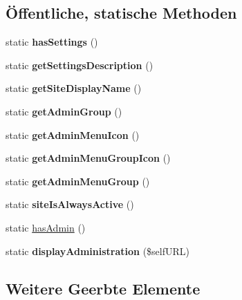 \subsection*{Öffentliche, statische Methoden}
\begin{DoxyCompactItemize}
\item 
\mbox{\label{class_admin_update_a3ccbcd4c40f7ea37d6d5cd3c8854d072}} 
static {\bfseries has\+Settings} ()
\item 
\mbox{\label{class_admin_update_af04ea0771e2fa826fbf9e7fc60eb94e8}} 
static {\bfseries get\+Settings\+Description} ()
\item 
\mbox{\label{class_admin_update_ab73ce503987a34927fc6cd4897b27dd3}} 
static {\bfseries get\+Site\+Display\+Name} ()
\item 
\mbox{\label{class_admin_update_a76fb358e2eeea2a78e02bedb582f6cf5}} 
static {\bfseries get\+Admin\+Group} ()
\item 
\mbox{\label{class_admin_update_af4f337ed572ced550be09ee479eb6238}} 
static {\bfseries get\+Admin\+Menu\+Icon} ()
\item 
\mbox{\label{class_admin_update_accc68fb9b0ecfa3b44d2c0875b6124c3}} 
static {\bfseries get\+Admin\+Menu\+Group\+Icon} ()
\item 
\mbox{\label{class_admin_update_aa87b66119364c028cbf73335484d8bfe}} 
static {\bfseries get\+Admin\+Menu\+Group} ()
\item 
\mbox{\label{class_admin_update_a9e7aa8cbb37fe2bba444dc0e31258b84}} 
static {\bfseries site\+Is\+Always\+Active} ()
\item 
static \mbox{\hyperlink{class_admin_update_a98628470dc9944743291ae99ca2a8f2c}{has\+Admin}} ()
\item 
\mbox{\label{class_admin_update_aa13e853979ed63e67de8e741dcac5946}} 
static {\bfseries display\+Administration} (\$self\+U\+RL)
\end{DoxyCompactItemize}
\subsection*{Weitere Geerbte Elemente}


